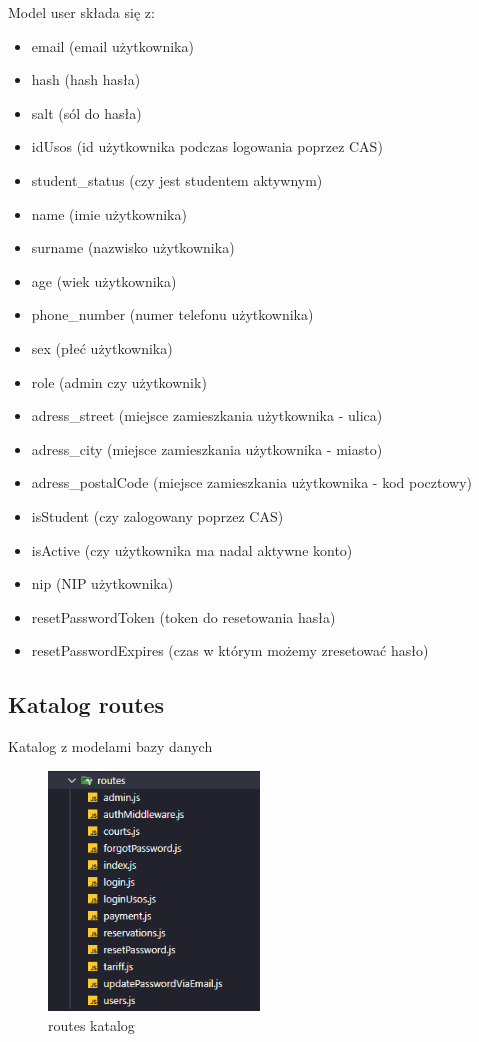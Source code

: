 \documentclass[titlepage]{article}
\begin{document}
Model user składa się z:
\begin{itemize}
  \item email (email użytkownika)
  \item hash (hash hasła)
  \item salt (sól do hasła)
  \item idUsos (id użytkownika podczas logowania poprzez CAS)
  \item student\_status (czy jest studentem aktywnym)
  \item name (imie użytkownika)
  \item surname (nazwisko użytkownika)
  \item age (wiek użytkownika)
  \item phone\_number (numer telefonu użytkownika)
  \item sex (płeć użytkownika)
  \item role (admin czy użytkownik)
  \item adress\_street (miejsce zamieszkania użytkownika - ulica)
  \item adress\_city (miejsce zamieszkania użytkownika - miasto)
  \item adress\_postalCode (miejsce zamieszkania użytkownika - kod pocztowy)
  \item isStudent (czy zalogowany poprzez CAS)
  \item isActive (czy użytkownika ma nadal aktywne konto)
  \item nip (NIP użytkownika)
  \item resetPasswordToken (token do resetowania hasła)
  \item resetPasswordExpires (czas w którym możemy zresetować hasło)
  
\end{itemize}

\newpage
\subsection{Katalog routes}
Katalog z modelami bazy danych

\begin{figure}[h]
\centering
\includegraphics[width=0.5\textwidth]{routes.png}
\caption{routes katalog}
\label{fig:obrazek routes}
\end{figure}
\end{document}
